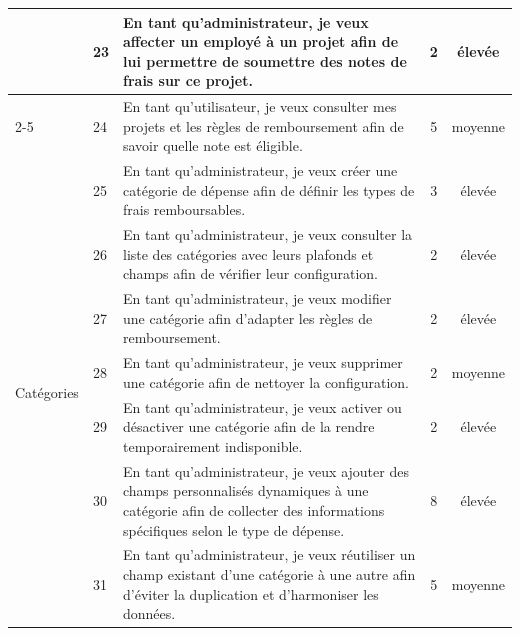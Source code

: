 \documentclass[12pt,a4paper]{report}
\begin{document}
\begin{longtable}{|p{2cm}|p{1cm}|p{8.3cm}|c|c|}
& 23 & En tant qu'administrateur, je veux affecter un employé à un projet afin de lui permettre de soumettre des notes de frais sur ce projet. & 2 & élevée \\

\cline{2-5}

& 24 & En tant qu'utilisateur, je veux consulter mes projets et les règles de remboursement afin de savoir quelle note est éligible. & 5 & moyenne \\

\hline



\multirow{7}{*}{Catégories} & 25 & En tant qu'administrateur, je veux créer une catégorie de dépense afin de définir les types de frais remboursables. & 3 & élevée \\

\cline{2-5}

& 26 & En tant qu'administrateur, je veux consulter la liste des catégories avec leurs plafonds et champs afin de vérifier leur configuration. & 2 & élevée \\

\cline{2-5}

& 27 & En tant qu'administrateur, je veux modifier une catégorie afin d’adapter les règles de remboursement. & 2 & élevée \\

\cline{2-5}

& 28 & En tant qu'administrateur, je veux supprimer une catégorie afin de nettoyer la configuration. & 2 & moyenne \\

\cline{2-5}

& 29 & En tant qu'administrateur, je veux activer ou désactiver une catégorie afin de la rendre temporairement indisponible. & 2 & élevée \\

\cline{2-5}

& 30 & En tant qu'administrateur, je veux ajouter des champs personnalisés dynamiques à une catégorie afin de collecter des informations spécifiques selon le type de dépense. & 8 & élevée \\

\cline{2-5}

& 31 & En tant qu'administrateur, je veux réutiliser un champ existant d'une catégorie à une autre afin d'éviter la duplication et d'harmoniser les données. & 5 & moyenne \\

\hline




\end{longtable}
\end{document}

